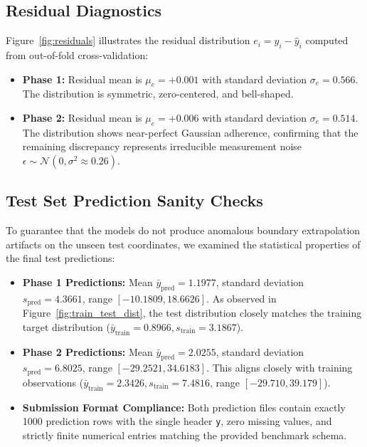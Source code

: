 \documentclass[10pt,twocolumn]{article}
\begin{document}
\subsection{Residual Diagnostics}
Figure~\ref{fig:residuals} illustrates the residual distribution $e_i = y_i - \hat{y}_i$ computed from out-of-fold cross-validation:
\begin{itemize}\setlength{\itemsep}{1pt}
    \item \textbf{Phase 1:} Residual mean is $\mu_e = +0.001$ with standard deviation $\sigma_e = 0.566$. The distribution is symmetric, zero-centered, and bell-shaped.
    \item \textbf{Phase 2:} Residual mean is $\mu_e = +0.006$ with standard deviation $\sigma_e = 0.514$. The distribution shows near-perfect Gaussian adherence, confirming that the remaining discrepancy represents irreducible measurement noise $\epsilon \sim \mathcal{N}(0, \sigma^2 \approx 0.26)$.
\end{itemize}

\subsection{Test Set Prediction Sanity Checks}
To guarantee that the models do not produce anomalous boundary extrapolation artifacts on the unseen test coordinates, we examined the statistical properties of the final test predictions:
\begin{itemize}\setlength{\itemsep}{1pt}
    \item \textbf{Phase 1 Predictions:} Mean $\bar{y}_{\text{pred}} = 1.1977$, standard deviation $s_{\text{pred}} = 4.3661$, range $[-10.1809, 18.6626]$. As observed in Figure~\ref{fig:train_test_dist}, the test distribution closely matches the training target distribution ($\bar{y}_{\text{train}} = 0.8966, s_{\text{train}} = 3.1867$).
    \item \textbf{Phase 2 Predictions:} Mean $\bar{y}_{\text{pred}} = 2.0255$, standard deviation $s_{\text{pred}} = 6.8025$, range $[-29.2521, 34.6183]$. This aligns closely with training observations ($\bar{y}_{\text{train}} = 2.3426, s_{\text{train}} = 7.4816$, range $[-29.710, 39.179]$).
    \item \textbf{Submission Format Compliance:} Both prediction files contain exactly 1000 prediction rows with the single header \texttt{y}, zero missing values, and strictly finite numerical entries matching the provided benchmark schema.
\end{itemize}
\end{document}
